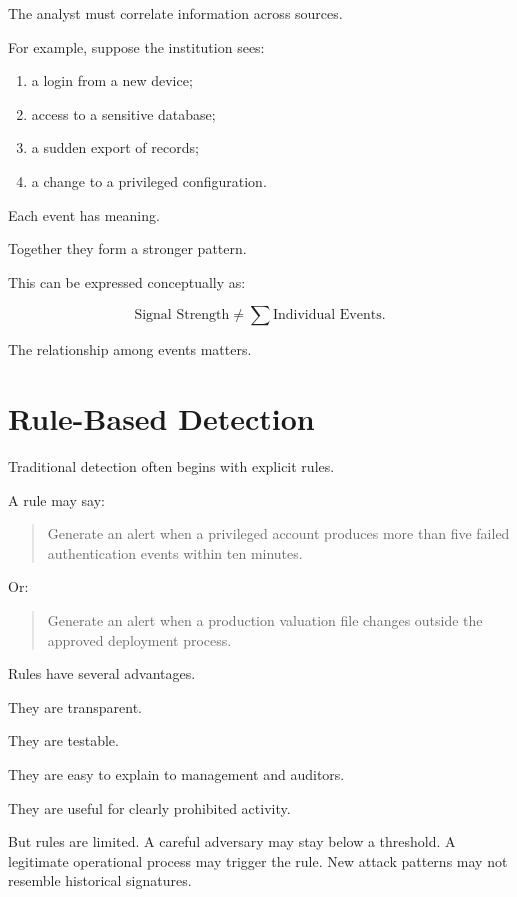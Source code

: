 The analyst must correlate information across sources.

For example, suppose the institution sees:

\begin{enumerate}
    \item a login from a new device;
    \item access to a sensitive database;
    \item a sudden export of records;
    \item a change to a privileged configuration.
\end{enumerate}

Each event has meaning.

Together they form a stronger pattern.

This can be expressed conceptually as:

\begin{equation}
\text{Signal Strength}
\neq
\sum \text{Individual Events}.
\end{equation}

The relationship among events matters.

\section{Rule-Based Detection}

Traditional detection often begins with explicit rules.

A rule may say:

\begin{quote}
Generate an alert when a privileged account produces more than five failed authentication events within ten minutes.
\end{quote}

Or:

\begin{quote}
Generate an alert when a production valuation file changes outside the approved deployment process.
\end{quote}

Rules have several advantages.

They are transparent.

They are testable.

They are easy to explain to management and auditors.

They are useful for clearly prohibited activity.

But rules are limited. A careful adversary may stay below a threshold. A legitimate operational process may trigger the rule. New attack patterns may not resemble historical signatures.

